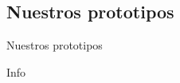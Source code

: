 %
%
%

\subsection{Nuestros prototipos}

\begin{frame}{Nuestros prototipos}
  
  Info


\end{frame}
